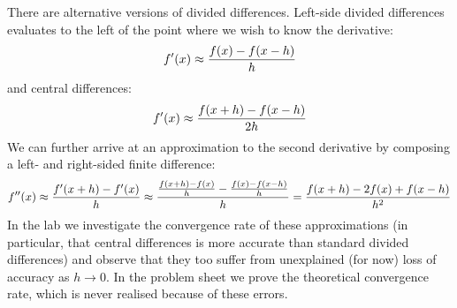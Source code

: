 There are alternative versions of divided differences. Left-side divided differences evaluates to the left of the point where we wish to know the derivative:
\[
f'(x) \ensuremath{\approx} {f(x) - f(x-h) \over h}
\]
and central differences:
\[
f'(x) \ensuremath{\approx} {f(x + h) - f(x - h) \over 2h}
\]
We can further arrive at an approximation to the second derivative by composing a left- and right-sided finite difference:
\[
f''(x) \ensuremath{\approx} {f'(x+h) - f'(x) \over h} \ensuremath{\approx} {{f(x+h) - f(x) \over h} - {f(x) - f(x-h) \over h} \over h}
= {f(x+h) - 2f(x)  + f(x-h) \over h^2}
\]
In the lab we investigate the convergence rate of these approximations (in particular, that  central differences is more accurate than standard divided differences) and observe that they too suffer from unexplained (for now) loss of accuracy as $h \ensuremath{\rightarrow} 0$. In the problem sheet we prove the theoretical convergence rate, which is never realised because of these errors.



